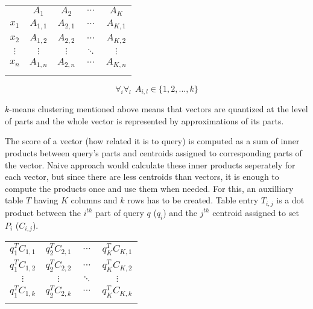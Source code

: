 \begin{center}
\renewcommand{\arraystretch}{1.2}
\begin{tabular}{c|c|c|c|c|}
\multicolumn{1}{r}{} & \multicolumn{1}{c}{$A_{1}$} & \multicolumn{1}{c}{$A_{2}$}
& \multicolumn{1}{c}{$\cdots$} & \multicolumn{1}{c}{$A_{K}$} \\
\hhline{~----}
$x_1$ & $A_{1,1}$ & $A_{2,1}$ & $\cdots$ & $A_{K,1}$ \\
\hhline{~----}
$x_2$ & $A_{1,2}$ & $A_{2,2}$ & $\cdots$ & $A_{K,2}$ \\
\hhline{~----}
$\vdots$ & $\vdots$ & $\vdots$ & $\ddots$ & $\vdots$ \\
\hhline{~----}
$x_n$ & $A_{1,n}$ & $A_{2,n}$ & $\cdots$ & $A_{K,n}$ \\
\hhline{~----}
\end{tabular}
\end{center}

\begin{equation*}
\forall_i \forall_l\ \  A_{i,l} \in \{1,2,...,k\}
\end{equation*}

$k$-means clustering mentioned above means that vectors are quantized at the level of parts
and the whole vector is represented by approximations of its parts.

The score of a vector (how related it is to query) is computed as a sum of inner products
between query's parts and centroids assigned to corresponding parts of the vector.
Naive approach would calculate these inner products seperately for each vector,
but since there are less centroids than vectors, it is enough to compute the products once
and use them when needed.
For this, an auxilliary table $T$ having $K$ columns and $k$ rows has to be created.
Table entry $T_{i,j}$ is a dot product between the $i^{th}$ part of query $q$ ($q_i$) and the $j^{th}$
centroid assigned to set $P_i$ ($C_{i,j}$).

\renewcommand{\arraystretch}{1.6}
\begin{center}
\begin{tabular}{|c|c|c|c|}
\hhline{----}
$ q_1^T C_{1,1} $ & $ q_2^T C_{2,1} $ & $ \cdots $ & $ q_K^T C_{K,1} $\\
\hhline{----}
$ q_1^T C_{1,2} $ & $ q_2^T C_{2,2} $ & $ \cdots $ & $ q_K^T C_{K,2} $\\
\hhline{----}
$ \vdots $ & $ \vdots $ & $ \ddots $ & $ \vdots $\\
\hhline{----}
$ q_1^T C_{1,k} $ & $ q_2^T C_{2,k} $ & $ \cdots $ & $ q_K^T C_{K,k} $\\
\hhline{----}
\end{tabular}
\end{center}


